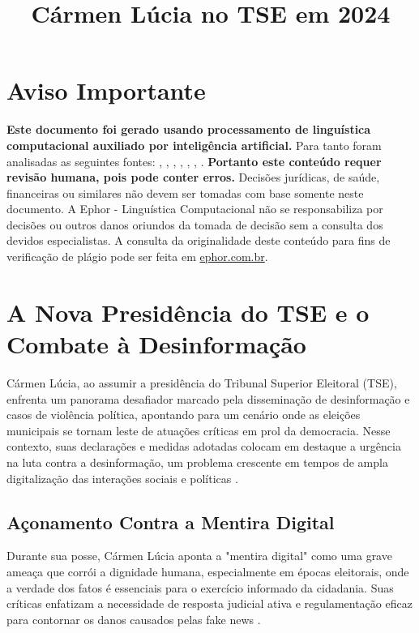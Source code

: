\documentclass[
   article,       
   12pt,          
   oneside,       
   a4paper,       
   english,       
   brazil,        
   sumario=tradicional
   ]{abntex2}
\begin{document}
\frenchspacing 
\maketitle

\textual
\section{Aviso Importante}
\textbf{Este documento foi gerado usando processamento de linguística computacional auxiliado por inteligência artificial.} Para tanto foram analisadas as seguintes fontes:  \cite{As_duas_preocupacoes_que_rondam_Carmen_Lucia_}, \cite{Carmen_Lucia_tem_de_afastar_TSE_da_polarizaca}, \cite{Carmen_Lucia_toma_posse_na_presidencia_do_TSE}, \cite{Contra_o_virus_da_mentira_ha_o_remedio_da_inf}, \cite{Mendonca_e_o_unico_ministro_do_STF_a_faltar_a}, \cite{Pacheco_participa_da_posse_na_Carmen_Lucia_na}, \cite{Quem_centraliza_poderes_em_uma_pessoa_chamase}.
\textbf{Portanto este conteúdo requer revisão humana, pois pode conter erros.} Decisões jurídicas, de saúde, financeiras ou similares não devem ser tomadas com base somente neste documento. A Ephor - Linguística Computacional não se responsabiliza por decisões ou outros danos oriundos da tomada de decisão sem a consulta dos devidos especialistas.
A consulta da originalidade deste conteúdo para fins de verificação de plágio pode ser feita em \href{http://www.ephor.com.br}{ephor.com.br}.
\title{Cármen Lúcia no TSE em 2024}

\section{A Nova Presidência do TSE e o Combate à Desinformação}
Cármen Lúcia, ao assumir a presidência do Tribunal Superior Eleitoral (TSE), enfrenta um panorama desafiador marcado pela disseminação de desinformação e casos de violência política, apontando para um cenário onde as eleições municipais se tornam leste de atuações críticas em prol da democracia. Nesse contexto, suas declarações e medidas adotadas colocam em destaque a urgência na luta contra a desinformação, um problema crescente em tempos de ampla digitalização das interações sociais e políticas \cite{Carmen_Lucia_toma_posse_na_presidencia_do_TSE}.

\subsection{Açonamento Contra a Mentira Digital}
Durante sua posse, Cármen Lúcia aponta a "mentira digital" como uma grave ameaça que corrói a dignidade humana, especialmente em épocas eleitorais, onde a verdade dos fatos é essenciais para o exercício informado da cidadania. Suas críticas enfatizam a necessidade de resposta judicial ativa e regulamentação eficaz para contornar os danos causados pelas fake news \cite{Contra_o_virus_da_mentira_ha_o_remedio_da_inf}.
\end{document}
